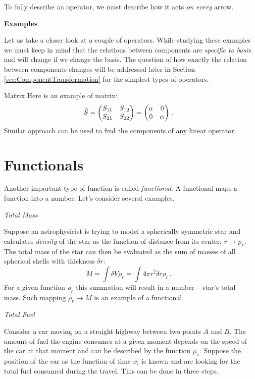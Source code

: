 To fully describe an operator, we must describe how it acts \emph{on
	every} arrow. 

\begin{flushleft}
	{\bf Examples}
\end{flushleft}
Let us take a closer look at a couple of operators. While studying
these examples we must keep in mind that the relations between
components are \emph{specific to basis} and will change if we change the
basis. The question of how exactly the relation between components
changes will be addressed later in Section
\ref{sec:ComponentTransformation} for the simplest types of operators.


\begin{mybio}{Matrix}
	Here is an example of matrix:
	\[
	\widehat{S} =
	\begin{pmatrix}
		S_{11} & S_{12}\\
		S_{21} & S_{22}
	\end{pmatrix} =
	\begin{pmatrix}
		\alpha & 0\\
		0 & \alpha
	\end{pmatrix}\,.
	\]
	Similar approach can be used to find the components of any linear operator.
\end{mybio}


\section{Functionals}
Another important type of function is called \emph{functional}. A functional maps a function into a number. Let's consider several examples.

\begin{flushleft}
	{\it Total Mass}
\end{flushleft}
Suppose an astrophysicist is trying to model a spherically symmetric star and calculates \emph{density} of the star as the function of distance from its center: $r\rightarrow\rho_r$. The total mass of the star can then be evaluated as the sum of masses of all spherical shells with thickness $\delta r$:
\[
M = \int \delta V\rho_r=\int 4\pi r^2\delta r\rho_r\,.
\]
For a given function $\rho_r$ this summation will result in a number -- star's total mass. Such mapping $\rho_r\rightarrow M$ is an example of a functional.

\begin{flushleft}
	{\it Total Fuel}
\end{flushleft}
Consider a car moving on a straight highway between two points $A$ and $B$. The amount of fuel the engine consumes at a given moment depends on the speed of the car at that moment and can be described by the function $\mu_v$. Suppose the position of the car as the function of time $x_t$ is known and are looking for the total fuel consumed during the travel. This can be done in three steps. 

